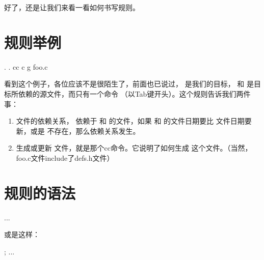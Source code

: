 \documentclass[a4paper,10pt]{sphinxmanual}
\begin{document}
好了，还是让我们来看一看如何书写规则。


\section{规则举例}
\label{\detokenize{rules:id2}}
\begin{sphinxVerbatim}[commandchars=\\\{\}]
 . .       
    cc \PYGZhy{}c \PYGZhy{}g foo.c
\end{sphinxVerbatim}

看到这个例子，各位应该不是很陌生了，前面也已说过，  是我们的目标，  和
 是目标所依赖的源文件，而只有一个命令  （以Tab键开头）。这个规则告诉我们两件事：
\begin{enumerate}
\def\theenumi{\arabic{enumi}}
\def\labelenumi{\theenumi .}
\makeatletter\def\p@enumii{\p@enumi \theenumi .}\makeatother
\item {} 
文件的依赖关系，  依赖于  和  的文件，如果 
和  的文件日期要比  文件日期要新，或是  不存在，那么依赖关系发生。

\item {} 
生成或更新  文件，就是那个cc命令。它说明了如何生成  这个文件。（当然，foo.c文件include了defs.h文件）

\end{enumerate}


\section{规则的语法}
\label{\detokenize{rules:id3}}
\begin{sphinxVerbatim}[commandchars=\\\{\}]
 
    ...
\end{sphinxVerbatim}

或是这样：

\begin{sphinxVerbatim}[commandchars=\\\{\}]
  ; 
    ...
\end{sphinxVerbatim}
\end{document}
